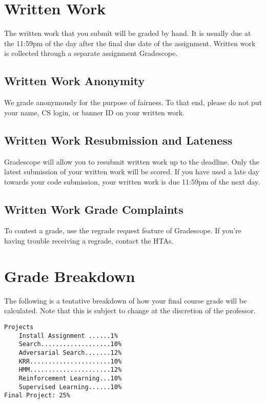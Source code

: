 \documentclass{article}
\begin{document}
\section{Written Work}
The written work that you submit will be graded by hand.
It is usually due at the 11:59pm of the day after the final due date of the assignment. 
Written work is collected through a separate assignment Gradescope.

\subsection{Written Work Anonymity}
We grade anonymously for the purpose of fairness.
To that end, please do not put your name, CS login, or banner ID on your written work.

\subsection{Written Work Resubmission and Lateness}
Gradescope will allow you to resubmit written work up to the deadline.
Only the latest submission of your written work will be scored. 
If you have used a late day towards your code submission, your written work is due 11:59pm of the next day.

\subsection{Written Work Grade Complaints}
To contest a grade, use the regrade request feature of Gradescope.
If you're having trouble receiving a regrade, contact the HTAs.

\section{Grade Breakdown}
The following is a tentative breakdown of how your final course grade will be calculated.
Note that this is subject to change at the discretion of the professor.

\begin{verbatim}
Projects
    Install Assignment ......1%
    Search...................10%
    Adversarial Search.......12%
    KRR......................10%
    HMM......................12%
    Reinforcement Learning...10%
    Supervised Learning......10%
Final Project: 25%
\end{verbatim}
\end{document}
